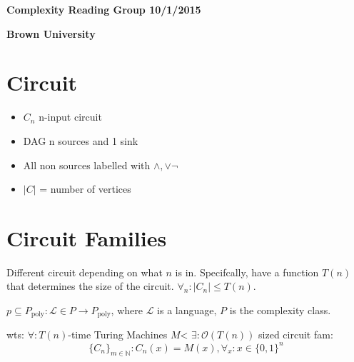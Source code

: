 \documentclass[11pt]{article} %
\begin{document}
\centerline{\LARGE{\bf Complexity Reading Group 10/1/2015}}
\vspace{2mm}
\centerline{\Large {\bf Brown University}}

\section{Circuit}

\begin{itemize}
\item $C_n$ n-input circuit
\item DAG n sources and 1 sink
\item All non sources labelled with $\wedge, \vee \neg$
\item $|C|$ = number of vertices
\end{itemize}

\section{Circuit Families}

Different circuit depending on what $n$ is in. Specifcally, have a function $T(n)$ that determines the size of the circuit. $\forall_n : |C_n| \leq T(n)$.




 $p \subseteq P_{\text{poly}}: \mathcal{L} \in P \rightarrow P_{\text{poly}}$, where $\mathcal{L}$ is a language, $P$ is the complexity class.

wts: $\forall : T(n)$-time Turing Machines $M$< $\exists : \mathcal{O}(T(n))$ sized circuit fam:
\begin{equation*}
\{C_n\}_{m \in \mathbb{N}} : C_n(x) = M(x), \forall_x : x \in \{0,1\}^n
\end{equation*}

\end{document}
